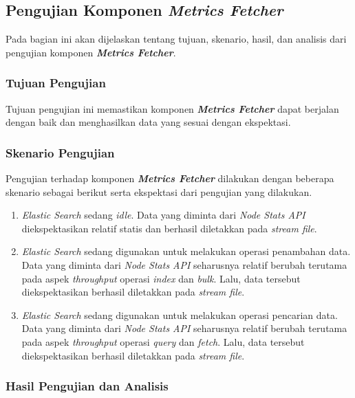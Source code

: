 \subsection{Pengujian Komponen \textit{Metrics Fetcher}}

Pada bagian ini akan dijelaskan tentang tujuan, skenario, hasil, dan analisis dari pengujian komponen \textbf{\textit{Metrics Fetcher}}.

\subsubsection{Tujuan Pengujian}

Tujuan pengujian ini memastikan komponen \textbf{\textit{Metrics Fetcher}} dapat berjalan dengan baik dan menghasilkan data yang sesuai dengan ekspektasi.

\subsubsection{Skenario Pengujian}

Pengujian terhadap komponen \textbf{\textit{Metrics Fetcher}} dilakukan dengan beberapa skenario sebagai berikut serta ekspektasi dari pengujian yang dilakukan.
\begin{enumerate}
    \item \textit{Elastic Search} sedang \textit{idle}.
        Data yang diminta dari \textit{Node Stats API} diekspektasikan relatif statis dan berhasil diletakkan pada \textit{stream file}.
    \item \textit{Elastic Search} sedang digunakan untuk melakukan operasi penambahan data.
        Data yang diminta dari \textit{Node Stats API} seharusnya relatif berubah terutama pada aspek \textit{throughput} operasi \textit{index} dan \textit{bulk}. Lalu, data tersebut diekspektasikan berhasil diletakkan pada \textit{stream file}.
    \item \textit{Elastic Search} sedang digunakan untuk melakukan operasi pencarian data.
        Data yang diminta dari \textit{Node Stats API} seharusnya relatif berubah terutama pada aspek \textit{throughput} operasi \textit{query} dan \textit{fetch}. Lalu, data tersebut diekspektasikan berhasil diletakkan pada \textit{stream file}.
\end{enumerate}

\subsubsection{Hasil Pengujian dan Analisis}

